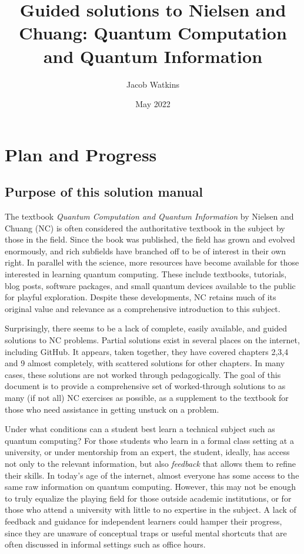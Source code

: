 \documentclass{book}
\title{Guided solutions to Nielsen and Chuang: Quantum Computation and Quantum Information}
\author{Jacob Watkins}
\date{May 2022}
\begin{document}
\maketitle

\setcounter{chapter}{-1}
\chapter{Plan and Progress}
\section{Purpose of this solution manual}
The textbook \emph{Quantum Computation and Quantum Information} by Nielsen and Chuang (NC) is often considered the authoritative textbook in the subject by those in the field. Since the book was published, the field has grown and evolved enormously, and rich subfields have branched off to be of interest in their own right. In parallel with the science, more resources have become available for those interested in learning quantum computing. These include textbooks, tutorials, blog posts, software packages, and small quantum devices available to the public for playful exploration. Despite these developments, NC retains much of its original value and relevance as a comprehensive introduction to this subject.

Surprisingly, there seems to be a lack of complete, easily available, and guided solutions to NC problems. Partial solutions exist in several places on the internet, including GitHub. It appears, taken together, they have covered chapters 2,3,4 and 9 almost completely, with scattered solutions for other chapters. In many cases, these solutions are not worked through pedagogically. The goal of this document is to provide a comprehensive set of worked-through solutions to as many (if not all) NC exercises as possible, as a supplement to the textbook for those who need assistance in getting unstuck on a problem.

Under what conditions can a student best learn a technical subject such as quantum computing? For those students who learn in a formal class setting at a university, or under mentorship from an expert, the student, ideally, has access not only to the relevant information, but also \emph{feedback} that allows them to refine their skills. In today's age of the internet, almost everyone has some access to the same raw information on quantum computing. However, this may not be enough to truly equalize the playing field for those outside academic institutions, or for those who attend a university with little to no expertise in the subject. A lack of feedback and guidance for independent learners could hamper their progress, since they are unaware of conceptual traps or useful mental shortcuts that are often discussed in informal settings such as office hours.
\end{document}
